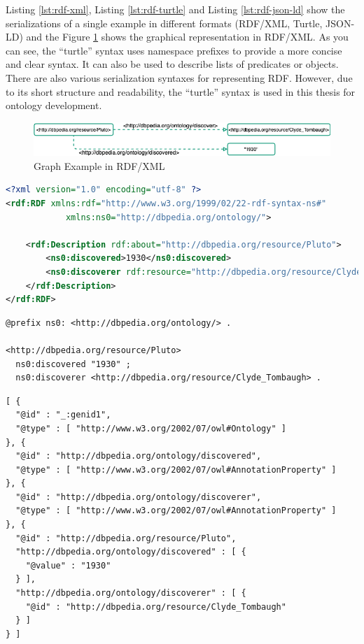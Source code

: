                 Listing \ref{lst:rdf-xml}, Listing \ref{lst:rdf-turtle} and Listing \ref{lst:rdf-json-ld} show the serializations of a single example in different formats (RDF/XML, Turtle, JSON-LD) and the Figure \ref{fig:rdf-xml-example} shows the graphical representation in RDF/XML. As you can see, the “turtle” syntax uses namespace prefixes to provide a more concise and clear syntax. It can also be used to describe lists of predicates or objects. There are also various serialization syntaxes for representing RDF. However, due to its short structure and readability, the “turtle” syntax is used in this thesis for ontology development.\\
            
                \begin{figure}[H]
                    \centering
                    \includegraphics[scale=0.6]{images/Foundation-RDF XML.drawio.png}
                    \caption{\label{fig:rdf-xml-example}  Graph Example in RDF/XML}
                \end{figure}

                \begin{lstlisting}[language=XML, caption=Example of RDF Serialization in RDF/XML, label={lst:rdf-xml}]
<?xml version="1.0" encoding="utf-8" ?>
<rdf:RDF xmlns:rdf="http://www.w3.org/1999/02/22-rdf-syntax-ns#"
            xmlns:ns0="http://dbpedia.org/ontology/">

    <rdf:Description rdf:about="http://dbpedia.org/resource/Pluto">
        <ns0:discovered>1930</ns0:discovered>
        <ns0:discoverer rdf:resource="http://dbpedia.org/resource/Clyde_Tombaugh"/>
    </rdf:Description>
</rdf:RDF>
                \end{lstlisting}

                \begin{lstlisting}[caption=Example of RDF Serialization in Turtle, label={lst:rdf-turtle}]
@prefix ns0: <http://dbpedia.org/ontology/> .

<http://dbpedia.org/resource/Pluto>
  ns0:discovered "1930" ;
  ns0:discoverer <http://dbpedia.org/resource/Clyde_Tombaugh> .
                \end{lstlisting}

                \begin{lstlisting}[caption=Example of RDF Serialization in JSON-LD, label={lst:rdf-json-ld}]
[ {
  "@id" : "_:genid1",
  "@type" : [ "http://www.w3.org/2002/07/owl#Ontology" ]
}, {
  "@id" : "http://dbpedia.org/ontology/discovered",
  "@type" : [ "http://www.w3.org/2002/07/owl#AnnotationProperty" ]
}, {
  "@id" : "http://dbpedia.org/ontology/discoverer",
  "@type" : [ "http://www.w3.org/2002/07/owl#AnnotationProperty" ]
}, {
  "@id" : "http://dbpedia.org/resource/Pluto",
  "http://dbpedia.org/ontology/discovered" : [ {
    "@value" : "1930"
  } ],
  "http://dbpedia.org/ontology/discoverer" : [ {
    "@id" : "http://dbpedia.org/resource/Clyde_Tombaugh"
  } ]
} ]
                \end{lstlisting}

